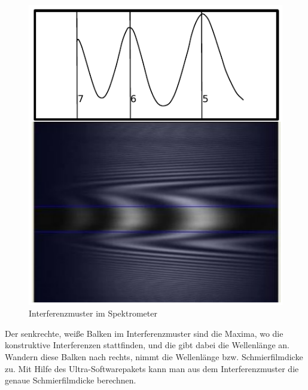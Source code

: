 \begin{figure}[htb]
    \centering
    \includegraphics[]{./images/interferenzsmuster.pdf}
    \caption{Interferenzmuster im Spektrometer \cite{ehl_broshure}}
    \label{fig:ehl_interferenzmuster}
\end{figure}
%
Der senkrechte, weiße Balken im Interferenzmuster sind die Maxima, wo die konstruktive Interferenzen stattfinden, und die gibt dabei die Wellenlänge an.
Wandern diese Balken nach rechts, nimmt die Wellenlänge bzw. Schmierfilmdicke zu.
Mit Hilfe des Ultra-Softwarepakets kann man aus dem Interferenzmuster die genaue Schmierfilmdicke berechnen.

